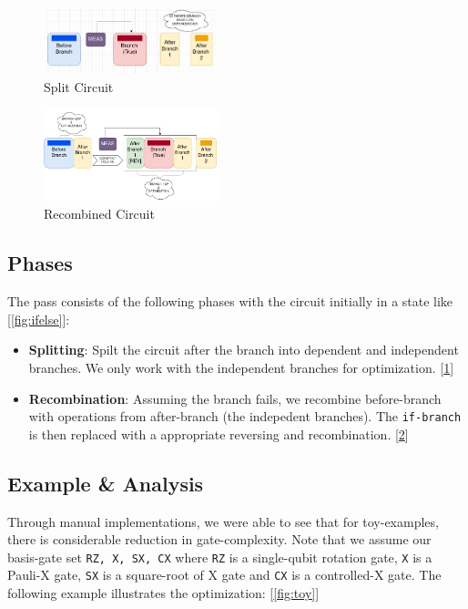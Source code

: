 \documentclass[10pt]{article}
\begin{document}
\begin{figure}[h]
\centering
  \includegraphics[width=0.45\textwidth]{Images/sep.png}
  \caption{Split Circuit}
  \label{fig:split}
\end{figure}

\begin{figure}[h]
\centering
  \includegraphics[width=0.45\textwidth]{Images/recomb.png}
  \caption{Recombined Circuit}
  \label{fig:recomb}
\end{figure}

\subsection{Phases}
The pass consists of the following phases with the circuit initially in a state like [\ref{fig:ifelse}]:
\begin{itemize}
  \item \textbf{Splitting}: Spilt the circuit after the branch into dependent and independent branches. We only work with the independent branches for optimization. [\ref{fig:split}]
  \item \textbf{Recombination}: Assuming the branch fails, we recombine before-branch with operations from after-branch (the indepedent branches). The \texttt{if-branch} is then replaced with a appropriate reversing and recombination. [\ref{fig:recomb}]
\end{itemize}

\subsection{Example \& Analysis}
Through manual implementations, we were able to see that for toy-examples, there is considerable reduction in gate-complexity. Note that we assume our basis-gate set \texttt{RZ, X, SX, CX} where \texttt{RZ} is a single-qubit rotation gate, \texttt{X} is a Pauli-X gate, \texttt{SX} is a square-root of X gate and \texttt{CX} is a controlled-X gate. The following example illustrates the optimization: [\ref{fig:toy}]\\
\end{document}
